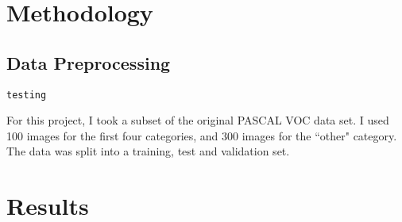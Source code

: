 \documentclass[10pt,a4paper]{article}
\begin{document}
%
\section{Methodology}
%
\subsection{Data Preprocessing}

\begin{lstlisting}
testing
\end{lstlisting}


For this project, I took a subset of the original PASCAL VOC data set. I used 100 images for the first four categories, and 300 images for the ``other" category. The data was split into a training, test and validation set.


\section{Results}
\end{document}
